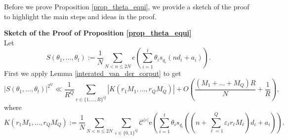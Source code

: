 \documentclass[12pt]{amsart}
\renewcommand{\leq}{\leqslant}
\theoremstyle{definition}
\numberwithin{equation}{section}
\newcommand\e{\mathrm{e}}
\numberwithin{equation}{section}
\begin{document}
Before we prove Proposition \ref{prop_theta_equi}, we provide a sketch of the proof to highlight the main steps and ideas in the proof.

\noindent\textbf{Sketch of the Proof of Proposition \ref{prop_theta_equi}}\\
Let
\[
    S(\theta_1, \dots, \theta_t) := \frac 1N \sum_{N<n\leq 2N}e\left(\sum_{i=1}^{t}\theta_is_{q_i}(nd_i+a_i)\right).
\]
First we apply Lemma \ref{interated_van_der_corput} to get 
\begin{equation*}
	|S(\theta_1, \dots, \theta_t)|^{2^Q} \ll \frac {1}{R^Q}\sum_{r\in\{1,\dots,R\}^Q}|K(r_1M_1,\dots,r_{Q}M_{Q})| + O\left(\frac{(M_1+\dots + M_{Q})R}{N}+\frac 1R\right),
\end{equation*}
where
\begin{equation*}
	K(r_1M_1,\dots, r_QM_Q) := \frac 1N \sum_{N<n\leq 2N} \sum_{\varepsilon\in \{0,1\}^Q}\mathcal{C}^{|\varepsilon|}
	\e\left(\sum_{i=1}^{t}\theta_i s_{q_i}\left(\left(n+\sum_{\ell = 1}^{Q}\varepsilon_{\ell}r_{\ell}M_{\ell}\right)d_i+a_i\right)\right).
\end{equation*}
\end{document}
